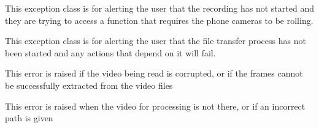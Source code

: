 \documentclass[letterpaper,10pt,english]{sphinxmanual}
\begin{document}

\begin{fulllineitems}
\label{\detokenize{index:src.Controllers.Exceptions.RecordingNotStartedException}}
This exception class is for alerting the user that the recording has not started and they
are trying to access a function that requires the phone cameras to be rolling.

\end{fulllineitems}


\begin{fulllineitems}
\label{\detokenize{index:src.Controllers.Exceptions.TransferNotStartedException}}
This exception class is for alerting the user that the file transfer process has not been
started and any actions that depend on it will fail.

\end{fulllineitems}


\begin{fulllineitems}
\label{\detokenize{index:src.Controllers.Exceptions.VideoCorruptedException}}
This error is raised if the video being read is corrupted, or if the frames cannot be
successfully extracted from the video files

\end{fulllineitems}


\begin{fulllineitems}
\label{\detokenize{index:src.Controllers.Exceptions.VideoNotPresentException}}
This error is raised when the video for processing is not there, or if an incorrect path is given

\end{fulllineitems}
\end{document}
